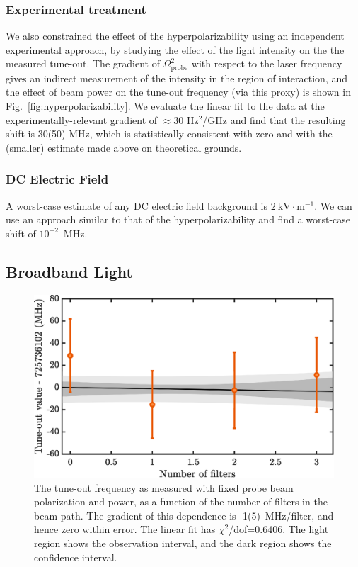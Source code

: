 \subsubsection{Experimental treatment}

	We also constrained the effect of the hyperpolarizability using an independent experimental approach, by studying the effect of the light intensity on the the measured tune-out. 
	The gradient of \(\Omega_{\text{probe}}^2\) with respect to the laser frequency gives an indirect measurement of the intensity in the region of interaction, and the effect of beam power on the tune-out frequency (via this proxy) is shown in Fig.~\ref{fig:hyperpolarizability}.
	We evaluate the linear fit to the data at the experimentally-relevant gradient of $\approx 30$ Hz$^2$/GHz and find that the resulting shift is 30(50) MHz, which is statistically consistent with zero and with the (smaller) estimate made above on theoretical grounds.
	

\subsubsection{DC Electric Field}

	A worst-case estimate of any DC electric field background is $2~\text{kV}\cdot\text{m}^{-1}$. 
	We can use an approach similar to that of the hyperpolarizability  and find a worst-case shift of \(10^{-2}\)~MHz.

\subsection{Broadband Light}
	\label{sec:BBL}
	\begin{figure}
	    \centering
	    \includegraphics[width=\textwidth]{fig/tuneout/filt_dep_new}
	    \caption{The tune-out frequency as measured with fixed probe beam polarization and power, as a function of the number of filters in the beam path. The gradient of this dependence is -1(5)~MHz/filter, and hence zero within error. The linear fit has $\chi^2$/dof=0.6406. The light region shows the observation interval, and the dark region shows the confidence interval.
	    }
	    \label{fig:broadband light dependence}
	\end{figure}

